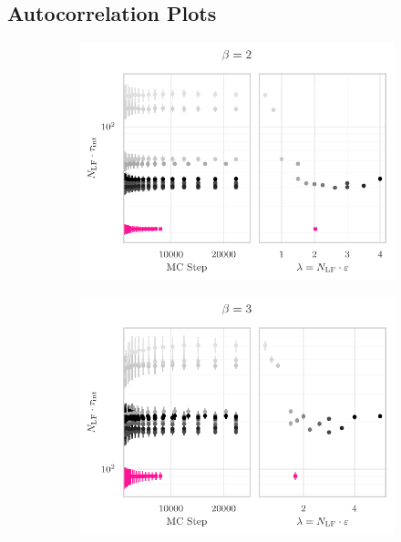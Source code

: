\documentclass{article} %
\begin{document}
{\subsection{\label{subsec:autocorr_plots}Autocorrelation Plots}
%
\begin{figure}[htpb]
   \centering
   \begin{subfigure}{0.4\textwidth}
      \includegraphics[width=\textwidth]{figures/autocorr_plots_2021_03_09/autocorr_vs_traj_len_2153_b2.pdf}
   \end{subfigure}
   \begin{subfigure}{0.4\textwidth}
      \includegraphics[width=\textwidth]{figures/autocorr_plots_2021_03_09/autocorr_vs_traj_len_2151_b3.pdf}

\end{subfigure}
\end{figure}}
\end{document}
